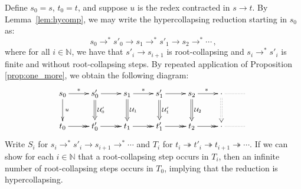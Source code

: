 \documentclass{LMCS}
\theoremstyle{plain}
\theoremstyle{definition}
\newcommand{\rew}{\rightarrow}
\newcommand{\rewt}{\rightarrow^*}
\newcommand{\trewt}{\twoheadrightarrow}
\newcommand{\natnum}{\mathbb{N}}
\begin{document}
\proof
Define $s_0 = s$, $t_0 = t$, and suppose $u$ is the redex contracted in $s \rew t$. By Lemma~\ref{lem:hycomp}, we may write the hypercollapsing reduction starting in $s_0$ as:
\[
s_0 \rewt s'_0 \rew s_1 \rewt s'_1 \rew s_2 \rewt \cdots  \, ,
\]
where for all $i \in \natnum$, we have that $s'_i \rew s_{i + 1}$ is root-collapsing and $s_i \rewt s'_i$ is finite and without root-collapsing steps.
By repeated application of Proposition
\ref{prop:one_more}, we obtain the following diagram:
\[
\xymatrix{
s_0 \ar[d]^{u} \ar[r]^{*} & s'_0 \ar@{=>}[d]^{\mathcal{U}'_0} \ar[r] & s_1
\ar@{=>}[d]^{\mathcal{U}_1} \ar[r]^{*} & s'_1 \ar@{=>}[d]^{\mathcal{U}'_1}
\ar[r] & s_2 \ar@{=>}[d]^{\mathcal{U}_2} \ar[r]^{*} & \cdot \ar@{:>}[d]
\ar@{.}[r] & \\
t_0 \ar@{->>}[r] & t'_0 \ar@{->>}[r] & t_1 \ar@{->>}[r] & t'_1 \ar@{->>}[r]
& t_2 \ar@{->>}[r] & \cdot \ar@{.}[r] &
}
\]
Write $S_i$ for $s_i \rewt s'_i \rew s_{i + 1} \rewt \cdots$ and
$T_i$ for $t_i \trewt t'_i \trewt t_{i + 1} \trewt \cdots$.
If we can show for each $i \in
\natnum$ that a root-collapsing step occurs in $T_i$, then an infinite
number of root-collapsing steps occurs in $T_0$, implying that the
reduction is hypercollapsing.
\end{document}

